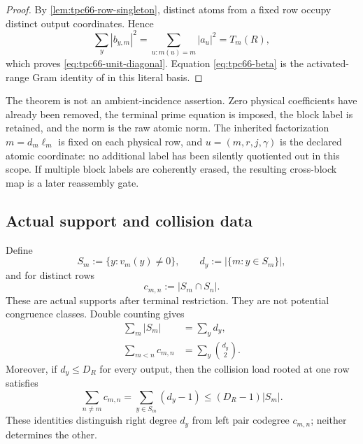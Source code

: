 \begin{proof}
By \cref{lem:tpc66-row-singleton}, distinct atoms from a fixed row occupy
distinct output coordinates. Hence
\[
 \sum_y|b_{y,m}|^2
 =\sum_{u:m(u)=m}|a_u|^2=T_m(R),
\]
which proves \eqref{eq:tpc66-unit-diagonal}. Equation
\eqref{eq:tpc66-beta} is the activated-range Gram identity of
\citet{WangTPC65} in this literal basis.
\end{proof}

\begin{remark}[Scope]
The theorem is not an ambient-incidence assertion. Zero physical
coefficients have already been removed, the terminal prime equation is
imposed, the block label is retained, and the norm is the raw atomic norm.
The inherited factorization \(m=d_m\ell_m\) is fixed on each physical row,
and \(u=(m,r,j,\gamma)\) is the declared atomic coordinate: no additional
label has been silently quotiented out in this scope.
If multiple block labels are coherently erased, the resulting cross-block map
is a later reassembly gate.
\end{remark}

\subsection{Actual support and collision data}
Define
\[
 S_m:=\{y:v_m(y)\ne0\},\qquad
 d_y:=|\{m:y\in S_m\}|,
\]
and for distinct rows
\[
 c_{m,n}:=|S_m\cap S_n|.
\]
These are actual supports after terminal restriction. They are not potential
congruence classes. Double counting gives
\begin{align}
 \sum_m|S_m|&=\sum_y d_y, \label{eq:tpc66-incidence-count}\\
 \sum_{m<n}c_{m,n}&=\sum_y\binom{d_y}{2}. \label{eq:tpc66-pair-count}
\end{align}
Moreover, if \(d_y\le D_R\) for every output, then the collision load rooted
at one row satisfies
\begin{equation}\label{eq:tpc66-rooted-load}
 \sum_{n\ne m}c_{m,n}
 =\sum_{y\in S_m}(d_y-1)
 \le(D_R-1)|S_m|.
\end{equation}
These identities distinguish right degree \(d_y\) from left pair codegree
\(c_{m,n}\); neither determines the other.
